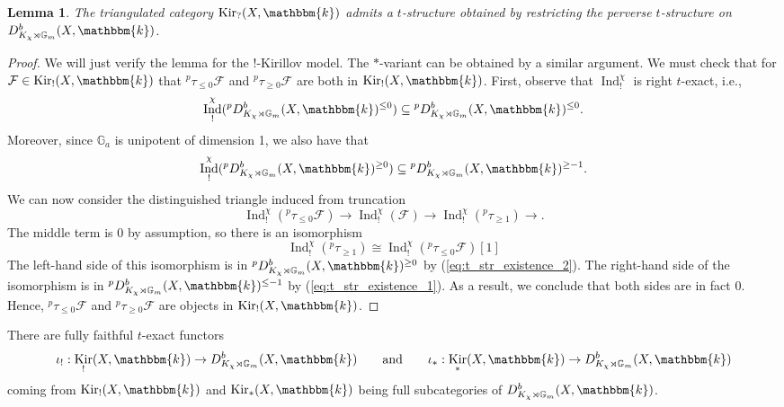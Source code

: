 \documentclass{amsart}
\newcommand{\G}{\mathbb{G}}
\renewcommand{\k}{\mathbbm{k}}
\newcommand{\scrF}{\mathcal{F}}
\DeclareMathOperator{\Ind}{Ind}
\DeclareMathOperator{\Kir}{Kir}
\newtheorem{lemma}[subsubsection]{Lemma}
\theoremstyle{definition}
\begin{document}
    \begin{lemma}\label{lem:t_str_existence}
        The triangulated category $\Kir_? (X, \k)$ admits a $t$-structure obtained by restricting the perverse $t$-structure on $D_{K_{\chi} \rtimes \G_m}^b (X, \k)$.
    \end{lemma}
    \begin{proof}
        We will just verify the lemma for the $!$-Kirillov model. The $*$-variant can be obtained by a similar argument.
        We must check that for $\scrF \in \Kir_! (X, \k)$ that ${}^p \tau_{\leq 0} \scrF$ and ${}^p \tau_{\geq 0} \scrF$ are both in $\Kir_! (X, \k)$.
        First, observe that $\Ind_!^{\chi}$ is right $t$-exact, i.e., 
        \begin{equation}\label{eq:t_str_existence_1}
                \Ind_!^{\chi} ({}^p D_{K_{\chi} \rtimes \G_m}^b (X, \k)^{\leq 0}) \subseteq {}^p D_{K_{\chi} \rtimes \G_m}^b (X, \k)^{\leq 0} .
        \end{equation}
        Moreover, since $\G_a$ is unipotent of dimension 1, we also have that
        \begin{equation}\label{eq:t_str_existence_2}
             \Ind_!^{\chi} ({}^p D_{K_{\chi} \rtimes \G_m}^b (X, \k)^{\geq 0}) \subseteq {}^p D_{K_{\chi} \rtimes \G_m}^b (X, \k)^{\geq -1} .
        \end{equation}
        We can now consider the distinguished triangle induced from truncation
        \[\Ind_!^{\chi} ({}^p \tau_{\leq 0} \scrF) \to \Ind_!^{\chi} (\scrF) \to \Ind_!^{\chi} ({}^p \tau_{\geq 1}) \to .\]
        The middle term is $0$ by assumption, so there is an isomorphism 
        \[ \Ind_!^{\chi} ({}^p \tau_{\geq 1}) \cong \Ind_!^{\chi} ({}^p \tau_{\leq 0} \scrF) [1] \]
        The left-hand side of this isomorphism is in ${}^p D_{K_{\chi} \rtimes \G_m}^b (X, \k)^{\geq 0}$ by (\ref{eq:t_str_existence_2}).
        The right-hand side of the isomorphism is in ${}^p D_{K_{\chi} \rtimes \G_m}^b (X, \k)^{\leq -1}$ by (\ref{eq:t_str_existence_1}).
        As a result, we conclude that both sides are in fact 0. Hence, ${}^p \tau_{\leq 0} \scrF$ and ${}^p \tau_{\geq 0} \scrF$ are objects in $\Kir_! (X, \k)$.
    \end{proof}

    There are fully faithful $t$-exact functors
    \[\iota_! : \Kir_! (X, \k) \to D_{K_{\chi} \rtimes \G_m}^b (X, \k) \qquad\text{and}\qquad \iota_* : \Kir_* (X, \k) \to D_{K_{\chi} \rtimes \G_m}^b (X, \k)\]
    coming from $\Kir_! (X, \k)$ and $\Kir_* (X, \k)$ being full subcategories of $D_{K_{\chi} \rtimes \G_m}^b (X, \k)$.
\end{document}

